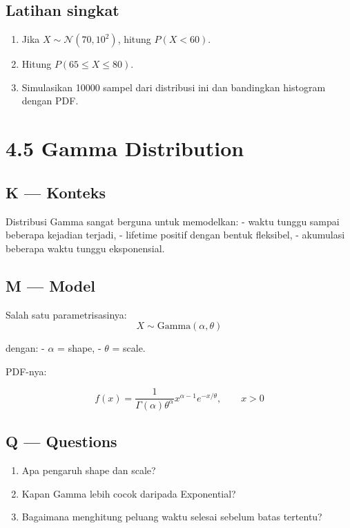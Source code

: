 \documentclass[
  letterpaper,
  DIV=11,
  numbers=noendperiod]{scrreprt}
\providecommand{\tightlist}{%
  \setlength{\itemsep}{0pt}\setlength{\parskip}{0pt}}
\begin{document}
\subsection{Latihan singkat}\label{latihan-singkat-12}

\begin{enumerate}
\def\labelenumi{\arabic{enumi}.}
\tightlist
\item
  Jika \(X \sim \mathcal{N}(70,10^2)\), hitung \(P(X < 60)\).
\item
  Hitung \(P(65 \le X \le 80)\).
\item
  Simulasikan 10000 sampel dari distribusi ini dan bandingkan histogram
  dengan PDF.
\end{enumerate}

\section{4.5 Gamma Distribution}\label{gamma-distribution}

\subsection{K --- Konteks}\label{k-konteks-22}

Distribusi Gamma sangat berguna untuk memodelkan: - waktu tunggu sampai
beberapa kejadian terjadi, - lifetime positif dengan bentuk fleksibel, -
akumulasi beberapa waktu tunggu eksponensial.

\subsection{M --- Model}\label{m-model-22}

Salah satu parametrisasinya: \[
X \sim \mathrm{Gamma}(\alpha, \theta)
\]

dengan: - \(\alpha\) = shape, - \(\theta\) = scale.

PDF-nya:

\[
f(x)=\frac{1}{\Gamma(\alpha)\theta^\alpha}x^{\alpha-1}e^{-x/\theta}, \qquad x>0
\]

\subsection{Q --- Questions}\label{q-questions-22}

\begin{enumerate}
\def\labelenumi{\arabic{enumi}.}
\tightlist
\item
  Apa pengaruh shape dan scale?
\item
  Kapan Gamma lebih cocok daripada Exponential?
\item
  Bagaimana menghitung peluang waktu selesai sebelum batas tertentu?
\end{enumerate}
\end{document}
